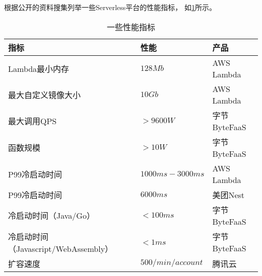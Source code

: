 根据公开的资料搜集列举一些Serverless平台的性能指标，
如\cref{table:serverless-performance}所示。

\begin{table}[ht]
\centering
\begin{tabularx}{\textwidth}{|l|l|X|}
\toprule
\textbf{指标} & \textbf{性能} & \textbf{产品} \\
\midrule
Lambda最小内存 & $ 128Mb $ & AWS Lambda\cite{aws_lambda_2022} \\
\hline
最大自定义镜像大小 & $ 10Gb $ & AWS Lambda\cite{aws_lambda_2022} \\
\hline
最大调用QPS & $ > 9600W $ & 字节ByteFaaS\cite{bytedance_faas} \\
\hline
函数规模 & $ > 10W $ & 字节ByteFaaS\cite{bytedance_faas} \\
\hline
P99冷启动时间 & $ 1000ms - 3000ms $ & AWS Lambda\cite{aws_lambda_2022} \\
\hline
P99冷启动时间 & $ 6000ms $ & 美团Nest\cite{meituan_serverless_nest} \\
\hline
冷启动时间（Java/Go） & $ < 100ms $ & 字节ByteFaaS\cite{bytedance_faas} \\
\hline
冷启动时间（Javascript/WebAssembly） & $ < 1ms $ & 字节ByteFaaS\cite{bytedance_faas} \\
\hline
扩容速度 & $ 500/min/account $ & 腾讯云\cite{tecent_cf_doc} \\
\bottomrule
\end{tabularx}

\caption{一些性能指标}
\label{table:serverless-performance}
\end{table}